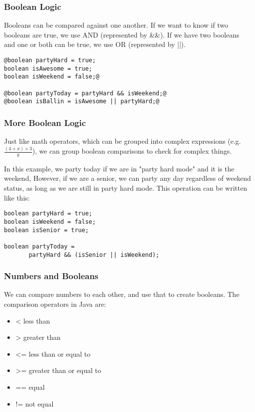 \documentclass{beamer}
\begin{document}
\begin{frame}[fragile]
\frametitle{Boolean Logic}
Booleans can be compared against one another. If we want to know if two booleans are true, we use AND (represented by \&\&). If we have two booleans and one or both can be true, we use OR (represented by ||).

\begin{lstlisting}[style=base]
@boolean partyHard = true;
boolean isAwesome = true;
boolean isWeekend = false;@

@boolean partyToday = partyHard && isWeekend;@
@boolean isBallin = isAwesome || partyHard;@
\end{lstlisting}
\end{frame}

\begin{frame}[fragile]
\frametitle{More Boolean Logic}
Just like math operators, which can be grouped into complex expressions (e.g. $\frac{\left(4+x\right)\times{3}}{y}$), we can group boolean comparisons to check for complex things.

\pause
In this example, we party today if we are in "party hard mode" and it is the weekend, However, if we are a senior, we can party any day regardless of weekend status, as long as we are still in party hard mode. This operation can be written like this:
\pause
\begin{lstlisting}
boolean partyHard = true;
boolean isWeekend = false;
boolean isSenior = true;

boolean partyToday =
       partyHard && (isSenior || isWeekend);
\end{lstlisting}
\end{frame}

\begin{frame}
\frametitle{Numbers and Booleans}
We can compare numbers to each other, and use that to create booleans. The comparison operators in Java are:
\begin{itemize}
\item<1->< less than
\item<2->> greater than
\item<3-><= less than or equal to
\item<4->>= greater than or equal to
\item<5->== equal
\item<6->!= not equal
\end{itemize}
\end{frame}
\end{document}
